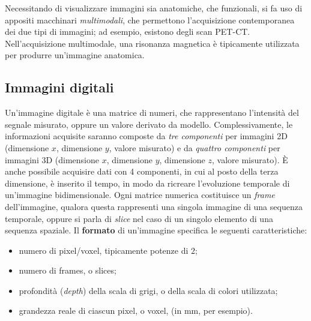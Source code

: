 \documentclass[11pt, a4paper]{scrartcl}
\theoremstyle{style}
\theoremstyle{style1}
\numberwithin{equation}{subsection}
\begin{document}
\noindent Necessitando di visualizzare immagini sia anatomiche, che funzionali, si fa uso di appositi macchinari \textit{multimodali}, che permettono l'acquisizione contemporanea dei due tipi di immagini; ad esempio, esistono degli scan PET-CT.
Nell'acquisizione multimodale, una risonanza magnetica \`e tipicamente utilizzata per produrre un'immagine anatomica.

\subsection{Immagini digitali}


Un'immagine digitale \`e una matrice di numeri, che rappresentano l'intensit\`a del segnale misurato, oppure un valore derivato da modello. 
Complessivamente, le informazioni acquisite saranno composte da \textit{tre componenti} per immagini 2D (dimensione $x$, dimensione $y$, valore misurato) e da \textit{quattro componenti} per immagini 3D (dimensione $x$, dimensione $y$, dimensione $z$, valore misurato).
\`E anche possibile acquisire dati con 4 componenti, in cui al posto della terza dimensione, \`e inserito il tempo, in modo da ricreare l'evoluzione temporale di un'immagine bidimensionale.
Ogni matrice numerica costituisce un \textit{frame} dell'immagine, qualora questa rappresenti una singola immagine di una sequenza temporale, oppure si parla di \textit{slice} nel caso di un singolo elemento di una sequenza spaziale.
Il \textbf{formato} di un'immagine specifica le seguenti caratteristiche:
\begin{itemize}
	\item numero di pixel/voxel, tipicamente potenze di $2$;
	\item numero di frames, o slices;
	\item profondit\`a (\textit{depth}) della scala di grigi, o della scala di colori utilizzata;
	\item grandezza reale di ciascun pixel, o voxel, (in mm, per esempio).
\end{itemize}
\end{document}

